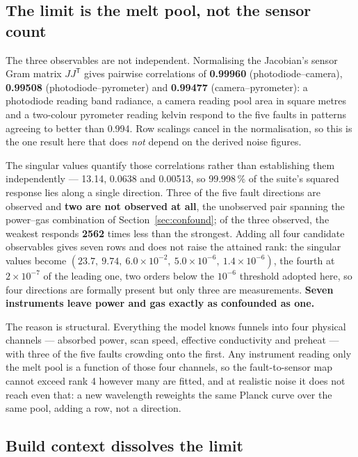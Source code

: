 \documentclass[preprint,times]{elsarticle}
\begin{document}
\subsection{The limit is the melt pool, not the sensor count}
\label{sec:melt}

The three observables are not independent. Normalising the Jacobian's sensor Gram
matrix $JJ^{\mathsf T}$ gives pairwise correlations of \textbf{0.99960}
(photodiode--camera), \textbf{0.99508} (photodiode--pyrometer) and
\textbf{0.99477} (camera--pyrometer): a photodiode reading band radiance, a
camera reading pool area in square metres and a two-colour pyrometer reading
kelvin respond to the five faults in patterns agreeing to better than 0.994. Row
scalings cancel in the normalisation, so this is the one result here that does
\emph{not} depend on the derived noise figures.

The singular values quantify those correlations rather than establishing them
independently --- 13.14, 0.0638 and 0.00513, so 99.998\,\% of the suite's squared
response lies along a single direction. Three of the five fault directions are
observed and \textbf{two are not observed at all}, the unobserved pair spanning
the power--gas combination of Section~\ref{sec:confound}; of the three observed,
the weakest responds \textbf{2562} times less than the strongest. Adding all four
candidate observables gives seven rows and does not raise the attained rank:
the singular values become $(23.7,\ 9.74,\ 6.0\times10^{-2},\ 5.0\times10^{-6},\
1.4\times10^{-6})$, the fourth at $2\times10^{-7}$ of the leading one, two orders
below the $10^{-6}$ threshold adopted here, so four directions are formally
present but only three are measurements. \textbf{Seven instruments leave power
and gas exactly as confounded as one.}

The reason is structural. Everything the model knows funnels into four physical
channels --- absorbed power, scan speed, effective conductivity and preheat ---
with three of the five faults crowding onto the first. Any instrument reading
only the melt pool is a function of those four channels, so the fault-to-sensor
map cannot exceed rank 4 however many are fitted, and at realistic noise it does
not reach even that: a new wavelength reweights the same Planck curve over the
same pool, adding a row, not a direction.

\subsection{Build context dissolves the limit}
\end{document}
